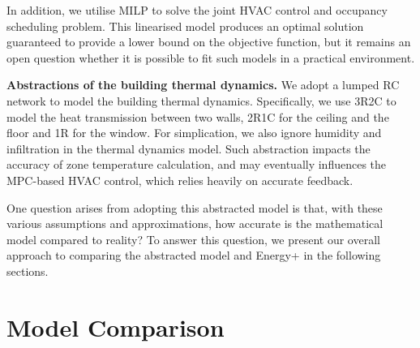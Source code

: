 In addition, we utilise MILP to solve the joint HVAC control and occupancy scheduling problem. This linearised model produces an optimal solution guaranteed to provide a lower bound on the objective function, but it remains an open question whether it is possible to fit such models in a practical environment. 

\textbf{Abstractions of the building thermal dynamics.} We adopt a lumped RC network to model the building thermal dynamics. Specifically, we use 3R2C to model the heat transmission between two walls, 2R1C for the ceiling and the floor and 1R for the window. For simplication, we also ignore humidity and infiltration in the thermal dynamics model. Such abstraction impacts the accuracy of zone temperature calculation, and may eventually influences the MPC-based HVAC control, which relies heavily on accurate feedback. 

One question arises from adopting this abstracted model is that, with these various assumptions and approximations, how accurate is the mathematical model compared to reality? To answer this question, we present our overall approach to comparing the abstracted model and Energy+ in the following sections.

\section{Model Comparison} \label{app:compare}


